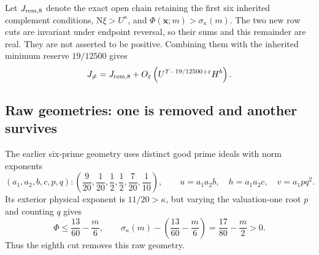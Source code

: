 \documentclass[11pt]{article}
\theoremstyle{definition}
\newcommand{\N}{\mathrm N}
\newcommand{\eps}{\varepsilon}
\begin{document}
Let $J_{\rm rem,8}$ denote the exact open chain retaining the first
six inherited complement conditions, $\N\xi>U^\kappa$, and
$\Phi(\boldsymbol x;m)>\sigma_\kappa(m)$.  The two new row cuts are
invariant under endpoint reversal, so their sums and this remainder
are real.  They are not asserted to be positive.  Combining them
with the inherited minimum reserve $19/12500$ gives
\begin{equation}
 J_{\ne}=J_{\rm rem,8}
  +O_\eps\left(U^{T-19/12500+\eps}H^b\right).
 \label{late-eq-row-remainder}
\end{equation}

\subsection{Raw geometries: one is removed and another survives}
\label{late-subsec-raw}

The earlier six-prime geometry uses distinct good prime ideals with
norm exponents
\[
 (a_1,a_2,b,c,p,q):
 \left(\frac9{20},\frac1{20},\frac12,\frac12,
                                      \frac7{20},\frac1{10}\right),
 \qquad
 u=a_1a_2b,\quad h=a_1a_2c,\quad v=a_1pq^2.
\]
Its exterior physical exponent is $11/20>\kappa$, but varying the
valuation-one root $p$ and counting $q$ gives
\[
 \Phi\le\frac{13}{60}-\frac m6,
 \qquad
 \sigma_\kappa(m)-\left(\frac{13}{60}-\frac m6\right)
                      =\frac{17}{80}-\frac m2>0.
\]
Thus the eighth cut removes this raw geometry.
\end{document}
